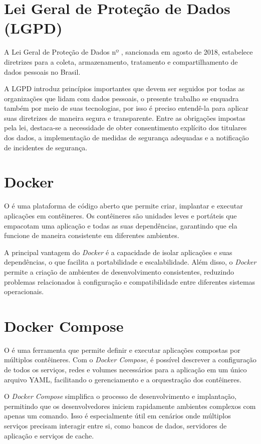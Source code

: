 \section{Lei Geral de Proteção de Dados (LGPD)}

A Lei Geral de Proteção de Dados nº , sancionada em agosto de 2018, estabelece diretrizes para a coleta, armazenamento, tratamento e compartilhamento de dados pessoais no Brasil.

A LGPD introduz princípios importantes que devem ser seguidos por todas as organizações que lidam com dados pessoais, o presente trabalho se enquadra também por meio de suas tecnologias, por isso é preciso entendê-la para aplicar suas diretrizes de maneira segura e transparente. Entre as obrigações impostas pela lei, destaca-se a necessidade de obter consentimento explícito dos titulares dos dados, a implementação de medidas de segurança adequadas e a notificação de incidentes de segurança.

\section{Docker}

O \emph{} é uma plataforma de código aberto que permite criar, implantar e executar aplicações em contêineres. Os contêineres são unidades leves e portáteis que empacotam uma aplicação e todas as suas dependências, garantindo que ela funcione de maneira consistente em diferentes ambientes.

A principal vantagem do \emph{Docker} é a capacidade de isolar aplicações e suas dependências, o que facilita a portabilidade e escalabilidade. Além disso, o \emph{Docker} permite a criação de ambientes de desenvolvimento consistentes, reduzindo problemas relacionados à configuração e compatibilidade entre diferentes sistemas operacionais.

\section{Docker Compose}

O \emph{} é uma ferramenta que permite definir e executar aplicações compostas por múltiplos contêineres. Com o \emph{Docker Compose}, é possível descrever a configuração de todos os serviços, redes e volumes necessários para a aplicação em um único arquivo YAML, facilitando o gerenciamento e a orquestração dos contêineres.

O \emph{Docker Compose} simplifica o processo de desenvolvimento e implantação, permitindo que os desenvolvedores iniciem rapidamente ambientes complexos com apenas um comando. Isso é especialmente útil em cenários onde múltiplos serviços precisam interagir entre si, como bancos de dados, servidores de aplicação e serviços de cache.

